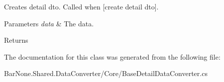 Creates detail dto. Called when \mbox{[}create detail dto\mbox{]}. 


\begin{DoxyParams}{Parameters}
{\em data} & The data.\\
\hline
\end{DoxyParams}
\begin{DoxyReturn}{Returns}

\end{DoxyReturn}


The documentation for this class was generated from the following file\+:\begin{DoxyCompactItemize}
\item 
Bar\+None.\+Shared.\+Data\+Converter/\+Core/Base\+Detail\+Data\+Converter.\+cs\end{DoxyCompactItemize}
